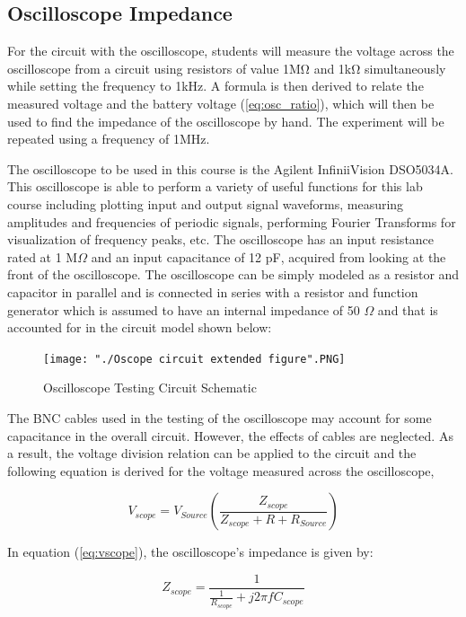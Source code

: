 \documentclass[a4paper,titlepage,10pt]{article}
\begin{document}
\subsection{Oscilloscope Impedance}
%
For the circuit with the oscilloscope, students will measure the voltage across the oscilloscope from a circuit using resistors of value 1MΩ and 1kΩ simultaneously while setting the frequency to 1kHz. A formula is then derived to relate the measured voltage and the battery voltage (\ref{eq:osc_ratio}), which will then be used to find the impedance of the oscilloscope by hand. The experiment will be repeated using a frequency of 1MHz.

The oscilloscope to be used in this course is the Agilent InfiniiVision DSO5034A. This oscilloscope is able to perform a variety of useful functions for this lab course including plotting input and output signal waveforms, measuring amplitudes and frequencies of periodic signals, performing Fourier Transforms for visualization of frequency peaks, etc. The oscilloscope has an input resistance rated at 1 M$\Omega$ and an input capacitance of 12 pF, acquired from looking at the front of the oscilloscope. The oscilloscope can be simply modeled as a resistor and capacitor in parallel and is connected in series with a resistor and function generator which is assumed to have an internal impedance of 50 $\Omega$ and that is accounted for in the circuit model shown below: 

\begin{figure}[h!]
	\centering
	\texttt{[image: "./Oscope circuit extended figure".PNG]}
	\caption{Oscilloscope Testing Circuit Schematic}
	\label{fig:scope_circuit}
\end{figure}


The BNC cables used in the testing of the oscilloscope may account for some capacitance in the overall circuit. However, the effects of cables are neglected. As a result, the voltage division relation can be applied to the circuit and the following equation is derived for the voltage measured across the oscilloscope,

\begin{equation}
	\label{eq:vscope}
	V_{scope} = V_{Source}(\frac{Z_{scope}}{Z_{scope} + R + R_{Source}}) 
\end{equation}

In equation (\ref{eq:vscope}), the oscilloscope's impedance is given by:

\begin{equation}
	\label{eq:zscope_main}
	Z_{scope} = \frac{1}{ \frac{1}{R_{scope}} + j 2 \pi f C_{scope}}
\end{equation}
	
\end{document}
